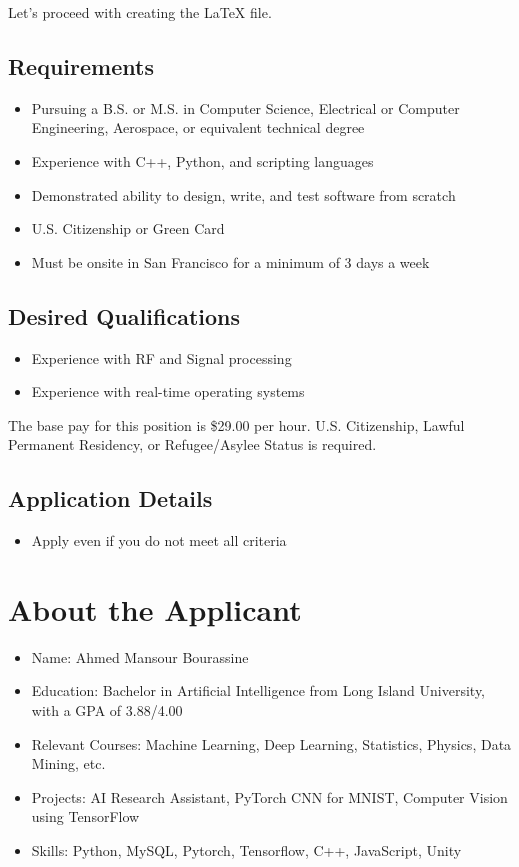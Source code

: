 Let's proceed with creating the LaTeX file.\documentclass{article}
\begin{document}
\subsection{Requirements}
\begin{itemize}
    \item Pursuing a B.S. or M.S. in Computer Science, Electrical or Computer Engineering, Aerospace, or equivalent technical degree
    \item Experience with C++, Python, and scripting languages
    \item Demonstrated ability to design, write, and test software from scratch
    \item U.S. Citizenship or Green Card
    \item Must be onsite in San Francisco for a minimum of 3 days a week
\end{itemize}

\subsection{Desired Qualifications}
\begin{itemize}
    \item Experience with RF and Signal processing
    \item Experience with real-time operating systems
\end{itemize}

The base pay for this position is \$29.00 per hour. U.S. Citizenship, Lawful Permanent Residency, or Refugee/Asylee Status is required.

\subsection{Application Details}
\begin{itemize}
    \item Apply even if you do not meet all criteria
\end{itemize}

\section{About the Applicant}
\begin{itemize}
    \item Name: Ahmed Mansour Bourassine
    \item Education: Bachelor in Artificial Intelligence from Long Island University, with a GPA of 3.88/4.00
    \item Relevant Courses: Machine Learning, Deep Learning, Statistics, Physics, Data Mining, etc.
    \item Projects: AI Research Assistant, PyTorch CNN for MNIST, Computer Vision using TensorFlow
    \item Skills: Python, MySQL, Pytorch, Tensorflow, C++, JavaScript, Unity
\end{itemize}
\end{document}
